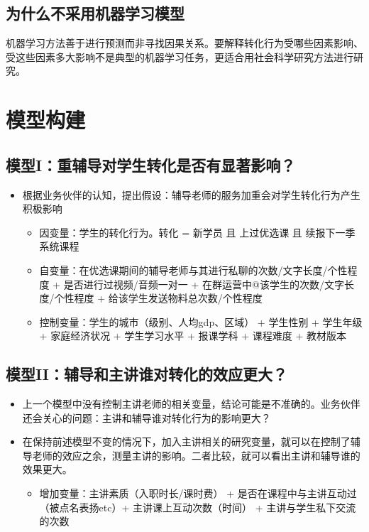 \documentclass[]{article}
\providecommand{\tightlist}{%
  \setlength{\itemsep}{0pt}\setlength{\parskip}{0pt}}
\begin{document}
\subsection{为什么不采用机器学习模型}\label{ux4e3aux4ec0ux4e48ux4e0dux91c7ux7528ux673aux5668ux5b66ux4e60ux6a21ux578b}

机器学习方法善于进行预测而非寻找因果关系。要解释转化行为受哪些因素影响、受这些因素多大影响不是典型的机器学习任务，更适合用社会科学研究方法进行研究。

\section{模型构建}\label{ux6a21ux578bux6784ux5efa}

\subsection{模型I：重辅导对学生转化是否有显著影响？}\label{ux6a21ux578biux91cdux8f85ux5bfcux5bf9ux5b66ux751fux8f6cux5316ux662fux5426ux6709ux663eux8457ux5f71ux54cd}

\begin{itemize}
\item
  根据业务伙伴的认知，提出假设：辅导老师的服务加重会对学生转化行为产生积极影响

  \begin{itemize}
  \item
    因变量：学生的转化行为。转化 = 新学员 且 上过优选课 且
    续报下一季系统课程
  \item
    自变量：在优选课期间的辅导老师与其进行私聊的次数/文字长度/个性程度 +
    是否进行过视频/音频一对一 +
    在群运营中@该学生的次数/文字长度/个性程度 +
    给该学生发送物料总次数/个性程度
  \item
    控制变量：学生的城市（级别、人均gdp、区域） + 学生性别 + 学生年级 +
    家庭经济状况 + 学生学习水平 + 报课学科 + 课程难度 + 教材版本
  \end{itemize}
\end{itemize}

\subsection{模型II：辅导和主讲谁对转化的效应更大？}\label{ux6a21ux578biiux8f85ux5bfcux548cux4e3bux8bb2ux8c01ux5bf9ux8f6cux5316ux7684ux6548ux5e94ux66f4ux5927}

\begin{itemize}
\item
  上一个模型中没有控制主讲老师的相关变量，结论可能是不准确的。业务伙伴还会关心的问题：主讲和辅导谁对转化行为的影响更大？
\item
  在保持前述模型不变的情况下，加入主讲相关的研究变量，就可以在控制了辅导老师的效应之余，测量主讲的影响。二者比较，就可以看出主讲和辅导谁的效果更大。

  \begin{itemize}
  \tightlist
  \item
    增加变量：主讲素质（入职时长/课时费） +
    是否在课程中与主讲互动过（被点名表扬etc）+ 主讲课上互动次数（时间）
    + 主讲与学生私下交流的次数
  \end{itemize}
\end{itemize}
\end{document}
